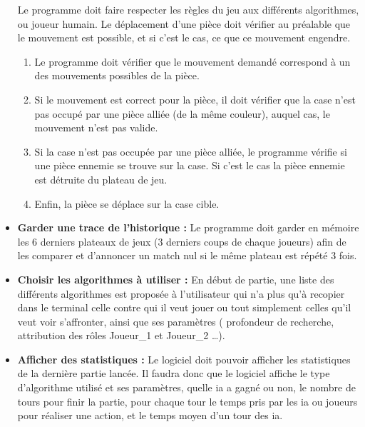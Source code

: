 \documentclass{article}
\begin{document}
\begin{itemize}
    \newline
    Le programme doit faire respecter les règles du jeu aux différents algorithmes, ou joueur humain.
    Le déplacement d'une pièce doit vérifier au préalable que le mouvement est possible, et si c'est le cas, ce que ce mouvement engendre.
    \begin{enumerate}
        \item Le programme doit vérifier que le mouvement demandé correspond à un des mouvements possibles de la pièce.
        \item Si le mouvement est correct pour la pièce, il doit vérifier que la case n'est pas occupé par une pièce alliée (de la même couleur), auquel cas, le mouvement n'est pas valide.
        \item Si la case n'est pas occupée par une pièce alliée, le programme vérifie si une pièce ennemie 
        se trouve sur la case. 
        Si c'est le cas la pièce ennemie est détruite du plateau de jeu.
        \item Enfin, la pièce se déplace sur la case cible.
    \end{enumerate}
    \medskip
    \item \textbf{Garder une trace de l'historique : }
    \newline
        Le programme doit garder en mémoire les 6 derniers plateaux de jeux (3 derniers coups de chaque joueurs) afin de les comparer et d'annoncer un match nul si le même plateau est répété 3 fois. 
    \medskip
    \item \textbf{Choisir les algorithmes à utiliser : }
        \newline
        En début de partie, une liste des différents algorithmes est proposée à l'utilisateur qui n'a plus qu'à recopier dans le terminal celle contre qui il veut jouer ou tout simplement celles qu'il veut voir s'affronter, ainsi que ses paramètres ( profondeur de recherche, attribution des rôles Joueur\_1 et Joueur\_2 \dots).
    \medskip
    \item \textbf{Afficher des statistiques :
    }
        \newline
        Le logiciel doit pouvoir afficher les statistiques de la dernière partie lancée. 
        \newline
        Il faudra donc que le logiciel affiche le type d'algorithme utilisé et ses paramètres, quelle ia a gagné ou non, le nombre de tours pour finir la partie, pour chaque tour le temps pris par les ia ou joueurs pour réaliser une action, et le temps moyen d'un tour des ia.

\end{itemize}
\end{document}
